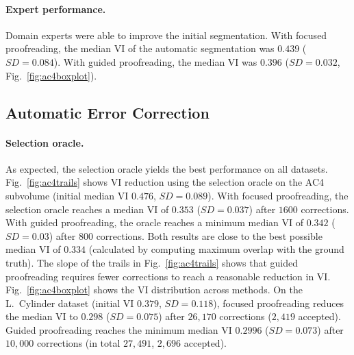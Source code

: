\begin{table}[t]
\caption{Average proofreading speed for novice users of Dojo, Focused Proofreading (FP) and our Guided Proofreading (GP). Our system achieves significantly higher VI reduction per minute (7.5$\times$) over state-of-the-art FP, while being slightly slower per correction.}%
\label{tab:correctiontimes}
\end{table}

\paragraph{Expert performance.} Domain experts were able to improve the initial segmentation. With focused proofreading, the median VI of the automatic segmentation was $0.439$ ($SD=0.084$). With guided proofreading, the median VI was $0.396$ ($SD=0.032$, Fig.~\ref{fig:ac4boxplot}).


\subsection{Automatic Error Correction}

\paragraph{Selection oracle.} As expected, the selection oracle yields the best performance on all datasets. Fig.~\ref{fig:ac4trails} shows VI reduction using the selection oracle on the AC4 subvolume (initial median VI $0.476$, $SD=0.089$). With focused proofreading, the selection oracle reaches a median VI of $0.353$ ($SD=0.037$) after $1600$ corrections. With guided proofreading, the oracle reaches a minimum median VI of $0.342$ ($SD=0.03$) after $800$ corrections. Both results are close to the best possible median VI of $0.334$ (calculated by computing maximum overlap with the ground truth). The slope of the trails in Fig.~\ref{fig:ac4trails} shows that guided proofreading requires fewer corrections to reach a reasonable reduction in VI. Fig.~\ref{fig:ac4boxplot} shows the VI distribution across methods. On the L.~Cylinder dataset (initial VI $0.379$, $SD=0.118$), focused proofreading reduces the median VI to $0.298$ ($SD=0.075$) after $26,170$ corrections ($2,419$ accepted). Guided proofreading reaches the minimum median VI $0.2996$ ($SD=0.073$) after $10,000$ corrections (in total $27,491$, $2,696$ accepted).

